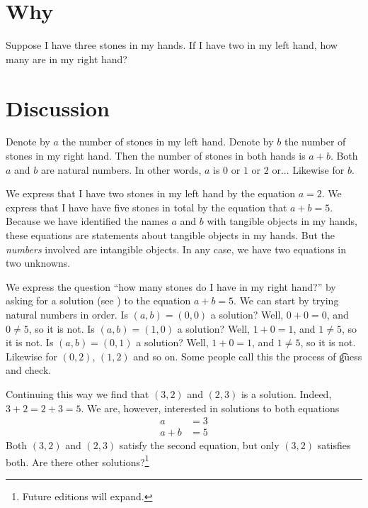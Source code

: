 

\section*{Why}

Suppose I have three stones in my hands.
If I have two in my left hand, how many are in my right hand?

\section*{Discussion}

Denote by $a$ the number of stones in my left hand.
Denote by $b$ the number of stones in my right hand.
Then the number of stones in both hands is $a + b$.
Both $a$ and $b$ are natural numbers.
In other words, $a$ is $0$ or $1$ or $2$ or...
Likewise for $b$.

We express that I have two stones in my left hand by the equation $a = 2$.
We express that I have have five stones in total by the equation that $a + b = 5$.
Because we have identified the names $a$ and $b$ with tangible objects in my hands, these equations are statements about tangible objects in my hands.
But the \textit{numbers} involved are intangible objects.
In any case, we have two equations in two unknowns.

We express the question ``how many stones do I have in my right hand?'' by asking for a solution (see ) to the equation $a + b = 5$.
We can start by trying natural numbers in order.
Is $(a, b) = (0, 0)$ a solution?
Well, $0 + 0 = 0$, and $0 \neq 5$, so it is not.
Is $(a, b) = (1, 0)$ a solution?
Well, $1 + 0 = 1$, and $1 \neq 5$, so it is not.
Is $(a, b) = (0, 1)$ a solution?
Well, $1 + 0 = 1$, and $1 \neq 5$, so it is not.
Likewise for $(0, 2)$, $(1, 2)$ and so on.
Some people call this the process of \t{guess and check}.

Continuing this way we find that $(3, 2)$ and $(2, 3)$ is a solution.
Indeed, $3 + 2 = 2 + 3 = 5$.
We are, however, interested in solutions to both equations
\[
\begin{aligned}
a &= 3 \\
a + b &= 5
\end{aligned}
\]
Both $(3, 2)$ and $(2, 3)$ satisfy the second equation, but only $(3, 2)$ satisfies both.
Are there other solutions?\footnote{Future editions will expand.}

\blankpage
